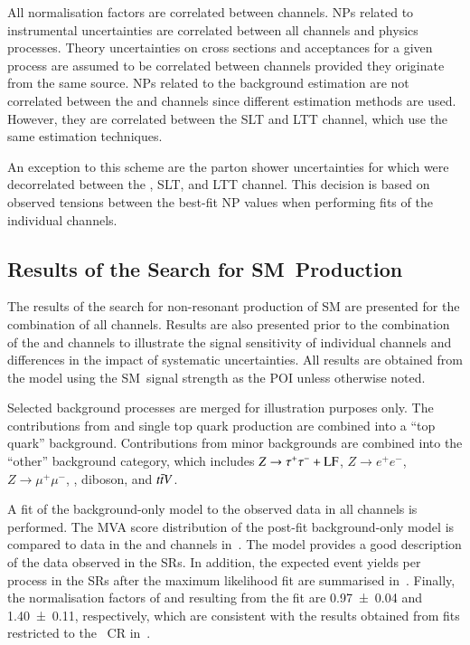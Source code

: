 All normalisation factors are correlated between channels. NPs related to
instrumental uncertainties are correlated between all channels and physics
processes. Theory uncertainties on cross sections and acceptances for a given
process are assumed to be correlated between channels provided they originate
from the same source. NPs related to the \faketauhadvis background estimation
are not correlated between the \hadhad and \lephad channels since different
estimation methods are used. However, they are correlated between the \lephad
SLT and LTT channel, which use the same estimation techniques.

An exception to this scheme are the parton shower uncertainties for \ttbar which
were decorrelated between the \hadhad, \lephad SLT, and \lephad LTT
channel. This decision is based on observed tensions between the best-fit NP
values when performing fits of the individual channels.



\subsection{Results of the Search for SM~\HH Production}%
\label{sec:results_nonres}

The results of the search for non-resonant production of SM \HH are presented
for the combination of all channels. Results are also presented prior to the
combination of the \hadhad and \lephad channels to illustrate the signal
sensitivity of individual channels and differences in the impact of systematic
uncertainties. All results are obtained from the model using the SM~\HH signal
strength as the POI unless otherwise noted.

Selected background processes are merged for illustration purposes only. The
contributions from \ttbar and single top quark production are combined into a
``top quark'' background. Contributions from minor backgrounds are combined into
the ``other'' background category, which includes $Z \to \tau^{+} \tau^{-} + \text{LF}$,
$Z \to e^{+}e^{-}$, $Z \to \mu^{+}\mu^{-}$,
\Wjets, diboson, and $t\bar{t} V$.

A fit of the background-only model to the observed data in all channels is
performed. The MVA score distribution of the post-fit background-only model is
compared to data in the \hadhad and \lephad channels
in~. The model provides a good description of the
data observed in the SRs. In addition, the expected event yields per process in
the SRs after the maximum likelihood fit are summarised
in~. Finally, the normalisation factors of \ttbar
and \ZHF resulting from the fit are \num{0.97 +- 0.04} and \num{1.40 +- 0.11},
respectively, which are consistent with the results obtained from fits
restricted to the \ZHF~CR in~.

